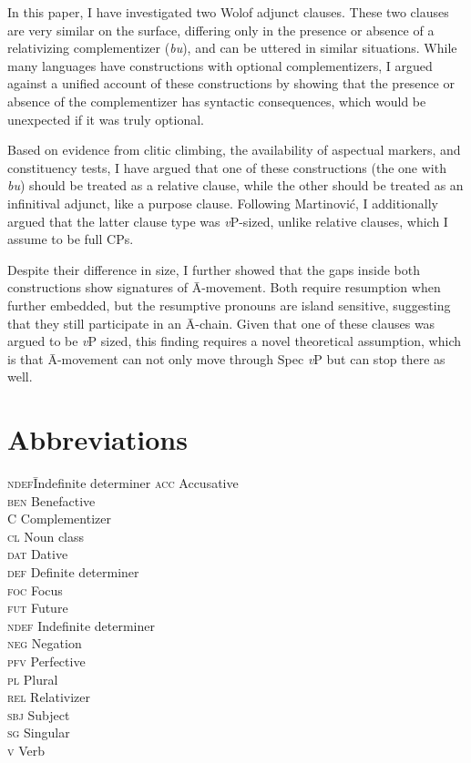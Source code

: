 \documentclass[output=paper]{langscibook}
\begin{document}
In this paper, I have investigated two Wolof adjunct clauses. These two clauses are very similar on the surface, differing only in the presence or absence of a relativizing complementizer (\emph{bu}), and can be uttered in similar situations. While many languages have constructions with optional complementizers, I argued against a unified account of these constructions by showing that the presence or absence of the complementizer has syntactic consequences, which would be unexpected if it was truly optional. 

Based on evidence from clitic climbing, the availability of aspectual markers, and constituency tests, I have argued that one of these constructions (the one with \emph{bu}) should be treated as a relative clause, while the other should be treated as an infinitival adjunct, like a purpose clause. Following Martinovi\'c, I additionally argued that the latter clause type was \textit{v}P-sized, unlike relative clauses, which I assume to be full CPs. 

Despite their difference in size, I further showed that the gaps inside both constructions show signatures of \={A}-movement. Both require resumption when further embedded, but the resumptive pronouns are island sensitive, suggesting that they still participate in an \={A}-chain. Given that one of these clauses was argued to be \textit{v}P sized, this finding requires a novel theoretical assumption, which is that \={A}-movement can not only move through Spec \textit{v}P but can stop there as well.\pagebreak


\section*{Abbreviations}

\begin{multicols}{2}
\begin{tabbing}
\textsc{ndef}\hspace{1ex}\=Indefinite determiner\kill
\textsc{acc}  \> Accusative \\
\textsc{ben}  \> Benefactive \\
\textsc{C} \> Complementizer\\
\textsc{cl} \> Noun class \\
\textsc{dat}  \> Dative \\
\textsc{def}  \> Definite determiner \\
\textsc{foc}  \> Focus \\
\textsc{fut}  \> Future\\
\textsc{ndef}  \> Indefinite determiner \\
\textsc{neg} \> Negation\\
\textsc{pfv}  \> Perfective \\
\textsc{pl} \> Plural\\
\textsc{rel}  \> Relativizer \\
\textsc{sbj} \> Subject \\
\textsc{sg} \> Singular\\
\textsc{v} \> Verb
\end{tabbing}
\end{multicols}
\end{document}
